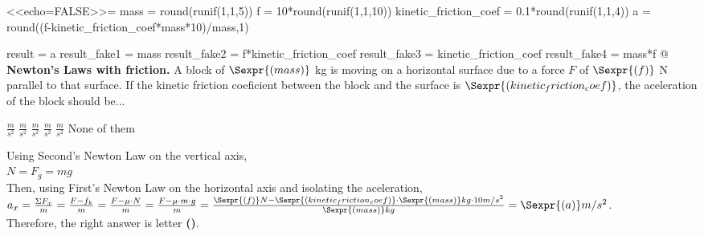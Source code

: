 \begin{problem}[h]
<<echo=FALSE>>=
mass = round(runif(1,1,5))
f = 10*round(runif(1,1,10))
kinetic_friction_coef = 0.1*round(runif(1,1,4))
a = round((f-kinetic_friction_coef*mass*10)/mass,1)

result = a
result_fake1 = mass
result_fake2 = f*kinetic_friction_coef
result_fake3 = kinetic_friction_coef
result_fake4 = mass*f
@
{\bf Newton's Laws with friction.} A block of $\Sexpr{(mass)}$ kg is moving on a horizontal surface due to a force $F$ of $\Sexpr{(f)}$ N parallel to that surface. If the kinetic friction coeficient between the block and the surface is $\Sexpr{(kinetic_friction_coef)}$, the aceleration of the block should be...
\begin{answers}{3}
    \bChoices[random]
    \label{resp4.2} $\frac{m}{s^2}$\eAns
     $\frac{m}{s^2}$\eAns 
     $\frac{m}{s^2}$\eAns
     $\frac{m}{s^2}$\eAns
     $\frac{m}{s^2}$\eAns
    \eFreeze
     None of them\eAns
    \eChoices 
\end{answers}
\begin{solution}
Using Second's Newton Law on the vertical axis,\\
$N = F_g = mg$\\
Then, using First's Newton Law on the horizontal axis and isolating the aceleration,\\
$a_x = \frac{\Sigma F_x}{m} = \frac{F-f_k}{m} = \frac{F-\mu\cdot N}{m} =\frac{F-\mu\cdot m \cdot g}{m} = \frac{\Sexpr{(f)}N-\Sexpr{(kinetic_friction_coef)}\cdot\Sexpr{(mass)}kg\cdot 10m/s^2}{\Sexpr{(mass)}kg} = \Sexpr{(a)}m/s^2$.\\
Therefore, the right answer is letter \textbf{()}.
\end{solution}
\end{problem}